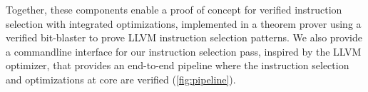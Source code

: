 \documentclass[review, anonymous, acmsmall, screen]{acmart}
\begin{document}
Together, these components enable a proof of concept for verified instruction selection with 
integrated optimizations, implemented in a theorem prover using a verified bit-blaster to prove LLVM 
instruction selection patterns. We also provide a commandline interface for our instruction 
selection pass, inspired by the LLVM optimizer, that provides an end-to-end pipeline where the 
instruction selection and optimizations at core are verified (\autoref{fig:pipeline}).










%

\end{document}
